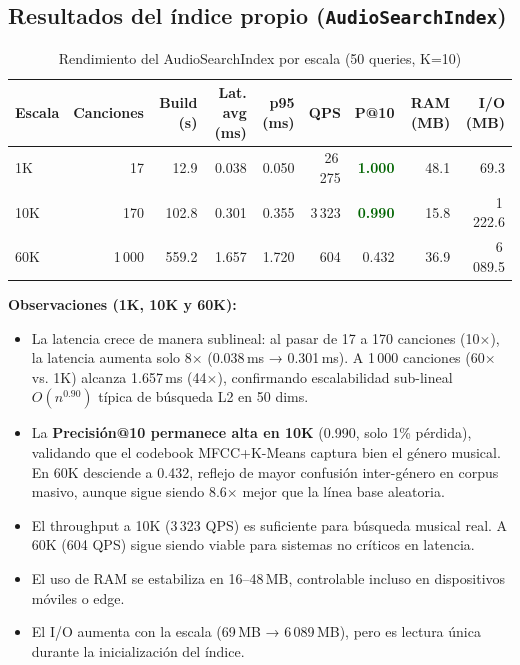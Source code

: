 \documentclass[12pt,a4paper]{article}
\newcommand{\win}[1]{\textcolor{darkgreen}{\textbf{#1}}}
\begin{document}
\subsection{Resultados del índice propio (\texttt{AudioSearchIndex})}

\begin{table}[H]
  \centering
  \caption{Rendimiento del AudioSearchIndex por escala (50 queries, K=10)}
  \begin{tabular}{lrrrrrrrr}
    \toprule
    \textbf{Escala} & \textbf{Canciones} & \textbf{Build (s)} &
    \textbf{Lat. avg (ms)} & \textbf{p95 (ms)} & \textbf{QPS} &
    \textbf{P@10} & \textbf{RAM (MB)} & \textbf{I/O (MB)} \\
    \midrule
    1K   & 17    & 12.9  & 0.038 & 0.050 & 26\,275 & \win{1.000} & 48.1  & 69.3 \\
    10K  & 170   & 102.8 & 0.301 & 0.355 & 3\,323  & \win{0.990} & 15.8  & 1\,222.6 \\
    60K  & 1\,000 & 559.2 & 1.657 & 1.720 & 604    & 0.432      & 36.9  & 6\,089.5 \\
    \bottomrule
  \end{tabular}
  \label{tab:audio-custom}
\end{table}

\noindent\textbf{Observaciones (1K, 10K y 60K):}
\begin{itemize}
  \item La latencia crece de manera sublineal: al pasar de 17 a 170 canciones
        (10$\times$), la latencia aumenta solo 8$\times$ (0.038\,ms → 0.301\,ms).
        A 1\,000 canciones (60$\times$ vs. 1K) alcanza 1.657\,ms (44$\times$),
        confirmando escalabilidad sub-lineal $O(n^{0.90})$ típica de búsqueda L2 en 50 dims.
  \item La \textbf{Precisión@10 permanece alta en 10K} (0.990, solo 1\% pérdida),
        validando que el codebook MFCC+K-Means captura bien el género musical.
        En 60K desciende a 0.432, reflejo de mayor confusión inter-género
        en corpus masivo, aunque sigue siendo 8.6$\times$ mejor que la línea base aleatoria.
  \item El throughput a 10K (3\,323 QPS) es suficiente para búsqueda musical
        real. A 60K (604 QPS) sigue siendo viable para sistemas no críticos en latencia.
  \item El uso de RAM se estabiliza en 16--48\,MB, controlable incluso en
        dispositivos móviles o edge.
  \item El I/O aumenta con la escala (69\,MB → 6\,089\,MB), pero es lectura única
        durante la inicialización del índice.
\end{itemize}
\end{document}
